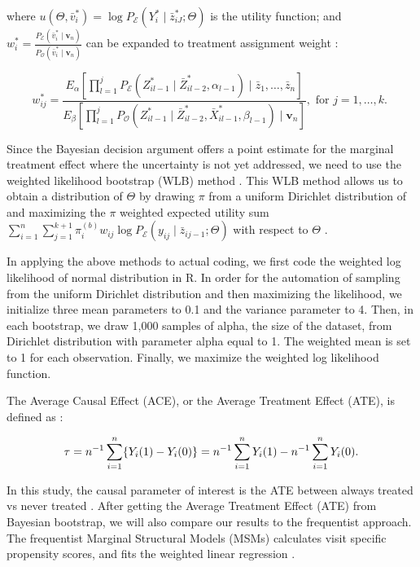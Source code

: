 where
\(u(\Theta, \bar{v}_{i}^*)= \log P_{\mathcal{E}}( Y_{i}^* \mid \bar{z}_{iJ}^*; \Theta)\)
is the utility function; and
\(w_{i}^* = \frac{P_{\mathcal{E}}(\bar{v}_{i}^* \mid \textbf{v}_n)}{P_{\mathcal{O}}(\bar{v}_{i}^* \mid \textbf{v}_n)}\)
can be expanded to treatment assignment weight \cite{liuBayesianCausal}:

\[
w_{i j}^{*}=\frac{E_{\alpha}\left[\prod_{l=1}^{j} P_{\mathcal{E}}\left(Z_{i l-1}^{*} \mid \bar{Z}_{i l-2}^{*}, \alpha_{l-1}\right) \mid \bar{z}_{1}, \ldots, \bar{z}_{n}\right]}{E_{\beta}\left[\prod_{l=1}^{j} P_{\mathcal{O}}\left(Z_{i l-1}^{*} \mid \bar{Z}_{i l-2}^{*}, \bar{X}_{i l-1}^{*}, \beta_{l-1}\right) \mid \mathbf{v}_{n}\right]}, \text { for } j=1, \ldots, k \text {. }
\]

Since the Bayesian decision argument offers a point estimate for the
marginal treatment effect where the uncertainty is not yet addressed, we
need to use the weighted likelihood bootstrap (WLB) method
\cite{liuBayesianCausal}. This WLB method allows us to obtain a
distribution of \(\Theta\) by drawing \(\pi\) from a uniform Dirichlet
distribution of and maximizing the \(\pi\) weighted expected utility sum
\(\sum_{i=1}^{n} \sum_{j=1}^{k+1} \pi_{i}^{(b)} w_{i j} \log P_{\mathcal{E}}\left(y_{i j} \mid \bar{z}_{i j-1} ; \Theta\right)\)
with respect to \(\Theta\) \cite{liuBayesianCausal}.

In applying the above methods to actual coding, we first code the
weighted log likelihood of normal distribution in R. In order for the
automation of sampling from the uniform Dirichlet distribution and then
maximizing the likelihood, we initialize three mean parameters to 0.1
and the variance parameter to 4. Then, in each bootstrap, we draw 1,000
samples of alpha, the size of the dataset, from Dirichlet distribution
with parameter alpha equal to 1. The weighted mean is set to 1 for each
observation. Finally, we maximize the weighted log likelihood function.

The Average Causal Effect (ACE), or the Average Treatment Effect (ATE),
is defined as \cite{dingFirstCourse}:

\[
  \tau = n^{-1} \sum_{i=1}^{n} \{Y_i(1) - Y_i(0)\} \\
  = n^{-1} \sum_{i=1}^{n} Y_i(1) - n^{-1} \sum_{i=1}^{n} Y_i(0).
\]

In this study, the causal parameter of interest is the ATE between
always treated vs never treated \cite{liu2023section3}. After getting
the Average Treatment Effect (ATE) from Bayesian bootstrap, we will also
compare our results to the frequentist approach. The frequentist
Marginal Structural Models (MSMs) calculates visit specific propensity
scores, and fits the weighted linear regression \cite{liu2023section3}.

